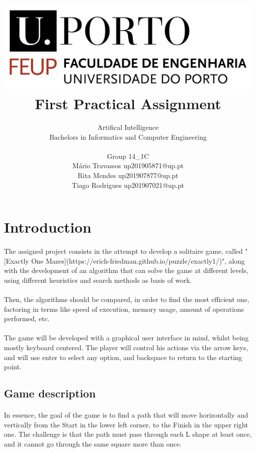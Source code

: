 \documentclass{article}
\title{\includegraphics[scale=0.3]{logo.png} \\ \textbf{First Practical Assignment}}
\author{Artifical Intelligence \\ Bachelors in Informatics and Computer Engineering \\ \\ Group 14\_1C   \\ Mário Travassos up201905871@up.pt \\ Rita Mendes up201907877@up.pt \\ Tiago Rodrigues up201907021@up.pt }
\begin{document}
    \maketitle

    \newpage

     \section{Introduction}

     \paragraph{}The assigned project consists in the attempt to develop a solitaire game, called "[Exactly One Mazes](https://erich-friedman.github.io/puzzle/exactly1/)", along with the development of an algorithm that can solve the game at different levels, using different heuristics and search methods as basis of work.

     \paragraph{}Then, the algorithms should be compared, in order to find the most efficient one, factoring in terms like speed of execution, memory usage, amount of operations performed, etc.

     \paragraph{}The game will be developed with a graphical user interface in mind, whilst being mostly keyboard centered. The player will control his actions via the arrow keys, and will use enter to select any option, and backspace to return to the starting point.

     \subsection{Game description}

     \paragraph{}In essence, the goal of the game is to find a path that will move horizontally and vertically from the Start in the lower left corner, to the Finish in the upper right one. The challenge is that the path must pass through each L shape at least once, and it cannot go through the same square more than once.
\end{document}
